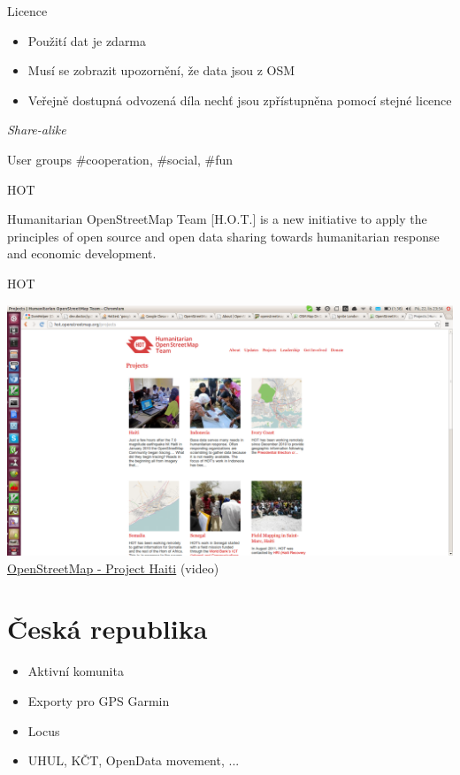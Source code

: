 \documentclass[xcolor=dvipsnames]{beamer}
\begin{document}
\begin{frame}{Licence}
    \begin{itemize}
        \item Použití dat je zdarma
        \item Musí se zobrazit upozornění, že data jsou z OSM
        \item Veřejně dostupná odvozená díla nechť jsou zpřístupněna pomocí stejné licence
    \end{itemize}
    \emph{Share-alike}
\end{frame}

\begin{frame}{User groups}
    \#cooperation, \#social, \#fun
\end{frame}

\begin{frame}{HOT}
\begin{block}{Humanitarian OpenStreetMap Team}
[H.O.T.] is a new initiative to apply the principles
of open source and open data sharing towards humanitarian response and economic
development.
\end{block}
\end{frame}

\begin{frame}{HOT}
\begin{center}
        \includegraphics[width=\textwidth]{images/hot.png}\\
        \href{http://vimeo.com/9182869}{OpenStreetMap - Project Haiti} (video)
\end{center}
\end{frame}

\section{Česká republika}
\begin{frame}
    \begin{itemize}
        \item Aktivní komunita
        \item Exporty pro GPS Garmin
        \item Locus
        \item UHUL, KČT, OpenData movement, ...
    \end{itemize}
\end{frame}
\end{document}
